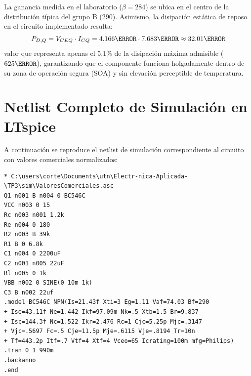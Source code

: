 \begin{table}[!ht]
  \centering
  \caption{Características eléctricas típicas del grupo de ganancia B del transistor BC547.}
  \label{tab:datasheet_caract}
\end{table}

La ganancia medida en el laboratorio ($\beta = 284$) se ubica en el centro de la distribución típica del grupo B ($290$).
Asimismo, la disipación estática de reposo en el circuito implementado resulta:
\begin{equation}
  P_{D,Q} = V_{CEQ} \cdot I_{CQ} = 4.166\V \cdot 7.683\mA \approx 32.01\mW
\end{equation}
valor que representa apenas el $5.1\%$ de la disipación máxima admisible ($625\mW$), garantizando que el componente
funciona holgadamente dentro de su zona de operación segura (SOA) y sin elevación perceptible de temperatura.

\section{Netlist Completo de Simulación en LTspice}

A continuación se reproduce el netlist de simulación correspondiente al circuito con valores comerciales normalizados:

\begin{lstlisting}[style=ltspice, caption={Netlist de simulación para el circuito con valores comerciales en LTspice.}, label={list:netlist_comercial}]
* C:\users\corte\Documents\utn\Electr-nica-Aplicada-\TP3\sim\ValoresComerciales.asc
Q1 n001 B n004 0 BC546C
VCC n003 0 15
Rc n003 n001 1.2k
Re n004 0 180
R2 n003 B 39k
R1 B 0 6.8k
C1 n004 0 2200uF
C2 n001 n005 22uF
Rl n005 0 1k
VBB n002 0 SINE(0 10m 1k)
C3 B n002 22uf
.model BC546C NPN(Is=21.43f Xti=3 Eg=1.11 Vaf=74.03 Bf=290
+ Ise=43.11f Ne=1.442 Ikf=97.09m Nk=.5 Xtb=1.5 Br=9.837
+ Isc=144.3f Nc=1.522 Ikr=2.476 Rc=1 Cjc=5.25p Mjc=.3147
+ Vjc=.5697 Fc=.5 Cje=11.5p Mje=.6115 Vje=.8194 Tr=10n
+ Tf=443.2p Itf=.7 Vtf=4 Xtf=4 Vceo=65 Icrating=100m mfg=Philips)
.tran 0 1 990m
.backanno
.end
\end{lstlisting}


